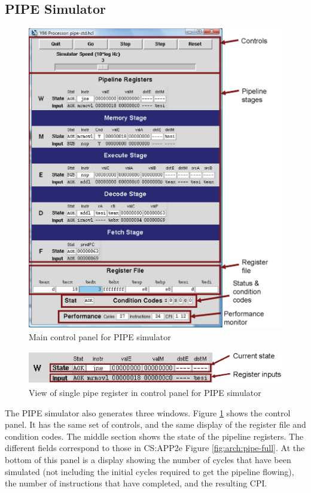 \documentclass[11pt]{article}
\begin{document}
\subsection{PIPE Simulator}
\begin{figure}
\centerline{\includegraphics*[scale=0.8]{pipe-cntl.eps}}
\caption{Main control panel for PIPE simulator}
\label{fig:sim:pipe-cntl}
\end{figure}

\begin{figure}
\centerline{\includegraphics*[scale=1.0]{pipe-register.eps}}
\caption{View of single pipe register in control panel for PIPE
simulator}
\label{fig:sim:pipe-register}
\end{figure}

The PIPE simulator also generates three windows.  Figure
\ref{fig:sim:pipe-cntl} shows the control panel.  It has the same set
of controls, and the same display of the register file and condition
codes.  The middle section shows the state of the pipeline registers.
The different fields correspond to those in CS:APP2e Figure
\ref{fig:arch:pipe-full}. At the bottom of this panel is a display
showing the number of cycles that have been simulated (not
including the initial cycles required to get the pipeline flowing),
the number of instructions that have completed, and the resulting
CPI\@.
\end{document}
